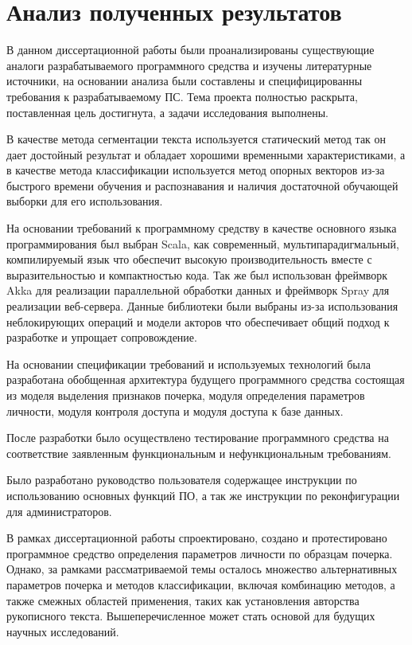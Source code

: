 \section{Анализ полученных результатов}
\label{sec:summary}

В данном диссертационной работы были проанализированы существующие аналоги разрабатываемого программного средства и изучены литературные источники, на основании анализа были составлены и специфицированны требования к разрабатываемому ПС. Тема проекта полностью раскрыта, поставленная цель достигнута, а задачи исследования выполнены.

В качестве метода сегментации текста используется статический метод так он дает достойный результат и обладает хорошими временными характеристиками, а в качестве метода классификации используется метод опорных векторов из-за быстрого времени обучения и распознавания и наличия достаточной обучающей выборки для его использования.

На основании требований к программному средству в качестве основного языка программирования был выбран Scala, как современный, мультипарадигмальный, компилируемый язык что обеспечит высокую производительность вместе с выразительностью и компактностью кода. Так же был использован фреймворк Akka для реализации параллельной обработки данных и фреймворк Spray для реализации веб-сервера. Данные библиотеки были выбраны из-за использования неблокирующих операций и модели акторов что обеспечивает общий подход к разработке и упрощает сопровождение.

На основании спецификации требований и используемых технологий была разработана обобщенная архитектура будущего программного средства состоящая из моделя выделения признаков почерка, модуля определения параметров личности, модуля контроля доступа и модуля доступа к базе данных.

После разработки было осуществлено тестирование программного средства на соответствие заявленным функциональным и нефункциональным требованиям.

Было разработано руководство пользователя содержащее инструкции по использованию основных функций ПО, а так же инструкции по реконфигурации для администраторов.

В рамках диссертационной работы спроектировано, создано и протестировано программное средство определения параметров личности по образцам почерка. Однако, за рамками рассматриваемой темы осталось множество альтернативных параметров почерка и методов классификации, включая комбинацию методов, а также смежных областей применения, таких как установления авторства рукописного текста. Вышеперечисленное может стать основой для будущих научных исследований.